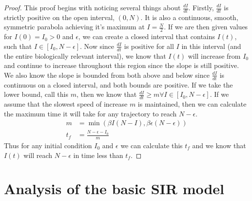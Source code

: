 \documentclass[12pt]{article}
\begin{document}
\begin{enumerate}[(a)]
\begin{enumerate}[(i)]
    {\color{blue}
      \begin{proof}
        This proof begins with noticing several things about $\frac{dI}{dt}$. Firstly, $\frac{dI}{dt}$ is strictly positive on the open interval, $(0,N)$. It is also a continuous, smooth, symmetric parabola achieving it's maximum at $I=\frac{N}{2}$. If we are then given values for $I(0)=I_0 > 0$ and $\epsilon$, we can  create a closed interval that contains $I(t)$, such that $I \in [I_0,N-\epsilon]$. Now since $\frac{dI}{dt}$ is positive for all $I$ in this interval (and the entire biologically relevant interval), we know that $I(t)$ will increase from $I_0$ and continue to increase throughout this region since the slope is still positive. We also know the slope is bounded from both above and below since $\frac{dI}{dt}$ is continuous on a closed interval, and both bounds are positive. If we take the lower bound, call this $m$, then we know that $\frac{dI}{dt} \geq m \forall I \in [I_0,N-\epsilon]$. If we assume that the slowest speed of increase $m$ is maintained, then we can calculate the maximum time it will take for any trajectory to reach $N-\epsilon$.
        \begin{equation}
        {\displaystyle {\begin{aligned}
        m&=\min(\beta I(N-I),\beta \epsilon(N-\epsilon))\\
        t_f&=\frac{N-\epsilon-I_0}{m}
        \end{aligned}}}
        \end{equation}
        Thus for any initial condition $I_0$ and $\epsilon$ we can calculate this $t_f$ and we know that  $I(t)$ will reach $N-\epsilon$ in time less than $t_f$.
      \end{proof}
    }
    
  \end{enumerate}
\end{enumerate}

\section{Analysis of the basic SIR model}
\end{document}
